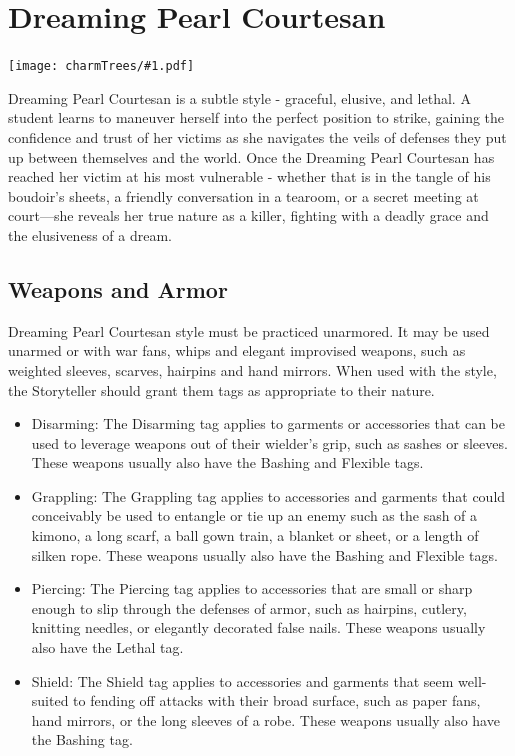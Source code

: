 \documentclass[oneside]{book}
\newenvironment{Ability}[1]{%
  \section{#1}%
  \vspace{-0.25in}\hspace*{-0.75in}\texttt{[image: charmTrees/\#1.pdf]}%
  \begin{multicols}{2}
}
{
  \end{multicols}
}
\begin{document}
\begin{Ability}{Dreaming Pearl Courtesan}
  \par Dreaming Pearl Courtesan is a subtle style - graceful, elusive, and lethal. A student learns to maneuver herself into the perfect position to strike, gaining the confidence and trust of her victims as she navigates the veils of defenses they put up between themselves and the world. Once the Dreaming Pearl Courtesan has reached her victim at his most vulnerable - whether that is in the tangle of his boudoir's sheets, a friendly conversation in a tearoom, or a secret meeting at court—she reveals her true nature as a killer, fighting with a deadly grace and the elusiveness of a dream.

  \subsection*{Weapons and Armor}
  Dreaming Pearl Courtesan style must be practiced unarmored. It may be used unarmed or with war fans, whips and elegant improvised weapons, such as weighted sleeves, scarves, hairpins and hand mirrors. When used with the style, the Storyteller should grant them tags as appropriate to their nature.

  \begin{itemize}
    \item Disarming: The Disarming tag applies to garments or accessories that can be used to leverage weapons out of their wielder's grip, such as sashes or sleeves. These weapons usually also have the Bashing and Flexible tags.
    \item Grappling: The Grappling tag applies to accessories and garments that could conceivably be used to entangle or tie up an enemy such as the sash of a kimono, a long scarf, a ball gown train, a blanket or sheet, or a length of silken rope. These weapons usually also have the Bashing and Flexible tags.
    \item Piercing: The Piercing tag applies to accessories that are small or sharp enough to slip through the defenses of armor, such as hairpins, cutlery, knitting needles, or elegantly decorated false nails. These weapons usually also have the Lethal tag.
    \item Shield: The Shield tag applies to accessories and garments that seem well-suited to fending off attacks with their broad surface, such as paper fans, hand mirrors, or the long sleeves of a robe. These weapons usually also have the Bashing tag.
  \end{itemize}


\end{Ability}
\end{document}
